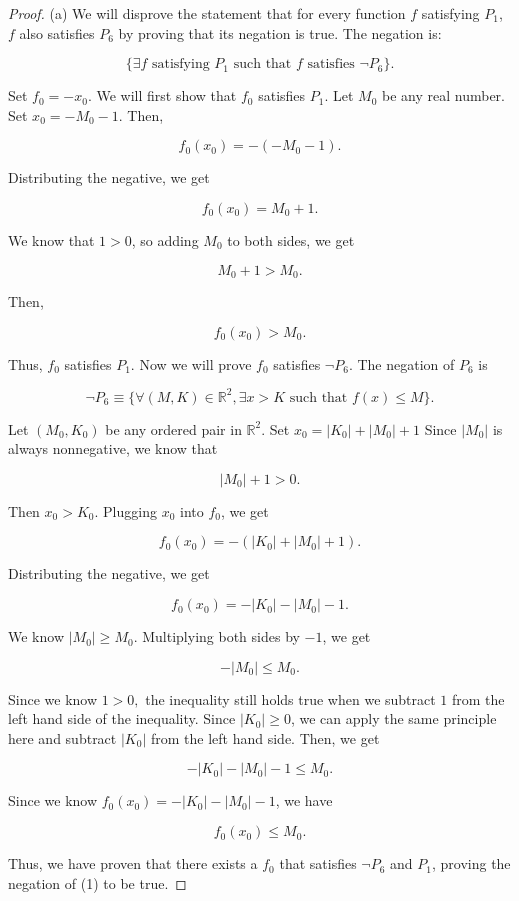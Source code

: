\documentclass[12pt]{article}
\begin{document}
\begin{proof} 

(a) We will disprove the statement that for every function $f$ satisfying $P_1$, $f$ also satisfies $P_6$ by proving that its negation is true. The negation is:

$$\{ \exists f \text{ satisfying } P_1 \text{ such that } f \text{ satisfies } \lnot P_6 \}.$$

Set $f_0 = -x_0$. We will first show that $f_0$ satisfies $P_1$. Let $M_0$ be any real number. Set $x_0 = -M_0 - 1.$ Then,

$$f_0(x_0) = -(-M_0 - 1).$$

Distributing the negative, we get 

$$f_0(x_0) = M_0 + 1.$$

We know that $1 > 0$, so adding $M_0$ to both sides, we get 

$$M_0 + 1 > M_0.$$

Then,

$$f_0(x_0) > M_0.$$

\newpage

Thus, $f_0$ satisfies $P_1$. Now we will prove $f_0$ satisfies $\lnot P_6.$ The negation of $P_6$ is

$$\lnot P_6 \equiv \{ \forall (M, K) \in \mathbb{R}^2, \exists x > K \text{ such that } f(x) \leq M \}. $$

Let $(M_0, K_0)$ be any ordered pair in $\mathbb{R}^2.$ Set $x_0 = | K_0 | + | M_0 | + 1$ Since $|M_0|$ is always nonnegative, we know that

$$| M_0 | + 1 > 0.$$

Then $x_0 > K_0.$ Plugging $x_0$ into $f_0$, we get

$$f_0(x_0) = -(| K_0 | + | M_0 | + 1).$$

Distributing the negative, we get

$$f_0(x_0) = -| K_0 | - | M_0 | - 1.$$

We know $|M_0| \geq M_0$. Multiplying both sides by $-1$, we get

$$-|M_0| \leq M_0.$$

Since we know $1 > 0,$ the inequality still holds true when we subtract $1$ from the left hand side of the inequality. Since $|K_0| \geq 0$, we can apply the same principle here and subtract $|K_0|$ from the left hand side. Then, we get

$$-|K_0| - |M_0| - 1 \leq M_0.$$

Since we know $f_0(x_0) = -| K_0 | - | M_0 | - 1$, we have

$$f_0(x_0) \leq M_0.$$

Thus, we have proven that there exists a $f_0$ that satisfies $\lnot P_6$ and $P_1$, proving the negation of (1) to be true.


\end{proof}
\end{document}
